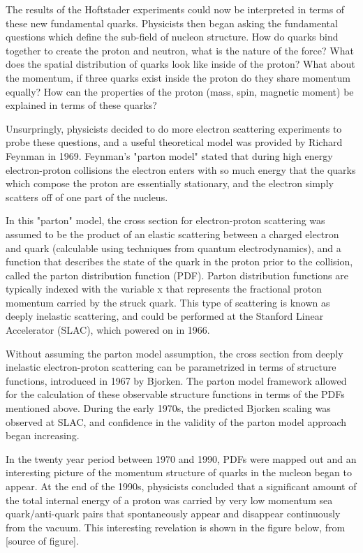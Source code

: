 The results of the Hoftstader experiments could now be interpreted in terms of these new fundamental quarks. Physicists then began asking the fundamental questions which define the sub-field of nucleon structure.  How do quarks bind together to create the proton and neutron, what is the nature of the force?  What does the spatial distribution of quarks look like inside of the proton?  What about the momentum, if three quarks exist inside the proton do they share momentum equally? How can the properties of the proton (mass, spin, magnetic moment) be explained in terms of these quarks?

Unsurpringly, physicists decided to do more electron scattering experiments to probe these questions, and a useful theoretical model was provided by Richard Feynman in 1969.  Feynman's "parton model" stated that during high energy electron-proton collisions the electron enters with so much energy that the quarks which compose the proton are essentially stationary, and the electron simply scatters off of one part of the nucleus.

In this "parton" model, the cross section for electron-proton scattering was assumed to be the product of an elastic scattering between a charged electron and quark (calculable using techniques from quantum electrodynamics), and a function that describes the state of the quark in the proton prior to the collision, called the parton distribution function (PDF).  Parton distribution functions are typically indexed with the variable x that represents the fractional proton momentum carried by the struck quark.  This type of scattering is known as deeply inelastic scattering, and could be performed at the Stanford Linear Accelerator (SLAC), which powered on in 1966.

Without assuming the parton model assumption, the cross section from deeply inelastic electron-proton scattering can be parametrized in terms of structure functions, introduced in 1967 by Bjorken.  The parton model framework allowed for the calculation of these observable structure functions in terms of the PDFs mentioned above.  During the early 1970s, the predicted Bjorken scaling was observed at SLAC, and confidence in the validity of the parton model approach began increasing.

In the twenty year period between 1970 and 1990, PDFs were mapped out and an interesting picture of the momentum structure of quarks in the nucleon began to appear.  At the end of the 1990s, physicists concluded that a significant amount of the total internal energy of a proton was carried by very low momentum sea quark/anti-quark pairs that spontaneously appear and disappear continuously from the vacuum.  This interesting revelation is shown in the figure below, from [source of figure].

